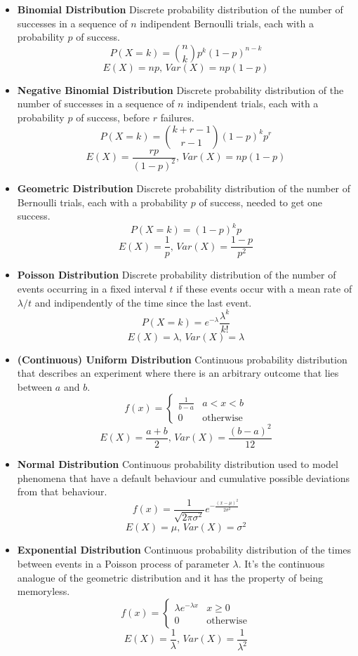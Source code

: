 \begin{itemize}[leftmargin=3ex]

\item \textbf{Binomial Distribution}
Discrete probability distribution of the number of successes in a sequence
of $n$ indipendent Bernoulli trials, each with a probability $p$ of success.
\[P(X = k) = \binom{n}{k}p^k(1 - p)^{n - k}\]
\[E(X) = np,\,Var(X) = np(1 - p)\]


\item \textbf{Negative Binomial Distribution}
Discrete probability distribution of the number of successes in a sequence
of $n$ indipendent trials, each with a probability $p$ of success,
before $r$ failures.
\[P(X = k) = \binom{k + r - 1}{r - 1}(1 - p)^kp^r\]
\[E(X) = \frac{rp}{(1 - p)^2},\,Var(X) = np(1 - p)\]


\item \textbf{Geometric Distribution}
Discrete probability distribution of the number of Bernoulli trials,
each with a probability $p$ of success, needed to get one success.
\[P(X = k) = (1 - p)^kp\]
\[E(X) = \frac{1}{p},\,Var(X) = \frac{1 - p}{p^2}\]


\item \textbf{Poisson Distribution}
Discrete probability distribution of the number of events occurring
in a fixed interval $t$ if these events occur with a mean rate of $\lambda / t$
and indipendently of the time since the last event.
\[P(X = k) = e^{-\lambda}\frac{\lambda^k}{k!}\]
\[E(X) = \lambda,\,Var(X) = \lambda\]


\item \textbf{(Continuous) Uniform Distribution}
Continuous probability distribution that describes an experiment
where there is an arbitrary outcome that lies between $a$ and $b$.
\[f(x) =
	\begin{cases}
		\frac{1}{b-a} & a < x < b \\
		0 & \textrm{otherwise}
	\end{cases}
\]
\[E(X) = \frac{a + b}{2},\,Var(X) = \frac{(b - a)^2}{12}\]


\item \textbf{Normal Distribution}
Continuous probability distribution used to model phenomena that have
a default behaviour and cumulative possible deviations from that behaviour.
\[f(x) = \frac{1}{\sqrt{2\pi\sigma^2}}e^{-\frac{(x - \mu)^2}{2\sigma^2}}\]
\[E(X) = \mu,\,Var(X) = \sigma^2\]


\item \textbf{Exponential Distribution}
Continuous probability distribution of the times between events
in a Poisson process of parameter $\lambda$.
It's the continuous analogue of the geometric distribution and
it has the property of being memoryless.
\[f(x) =
	\begin{cases}
		\lambda e^{-\lambda x} & x \ge 0 \\
		0 & \textrm{otherwise}
	\end{cases}
\]
\[E(X) = \frac{1}{\lambda},\,Var(X) = \frac{1}{\lambda^2}\]

\end{itemize}

